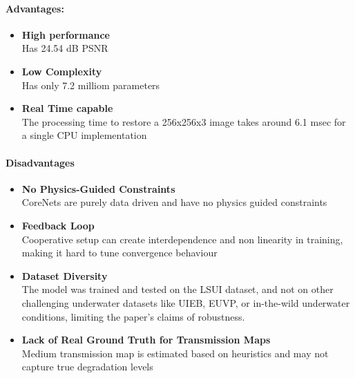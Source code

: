 \paragraph{Advantages:}
\begin{itemize}
    \item \textbf{High performance} \\
          Has 24.54 dB PSNR

    \item \textbf{Low Complexity} \\
          Has only 7.2 milliom parameters

    \item \textbf{Real Time capable} \\
           The processing time to restore a 256x256x3 image takes around 6.1 msec for a single CPU implementation

\end{itemize}

\paragraph{Disadvantages}

\begin{itemize}
    \item \textbf{No Physics-Guided Constraints} \\
          CoreNets are purely data driven and have no physics guided constraints

    \item \textbf{Feedback Loop} \\
          Cooperative setup can create interdependence and non linearity in training, making it hard to tune convergence behaviour

    \item \textbf{Dataset Diversity} \\
          The model was trained and tested on the LSUI dataset, and not on other challenging underwater datasets like UIEB, EUVP, or in-the-wild underwater conditions, limiting the paper's claims of robustness.

    \item \textbf{Lack of Real Ground Truth for Transmission Maps} \\
          Medium transmission map is estimated based on heuristics and may not capture true degradation levels
\end{itemize}